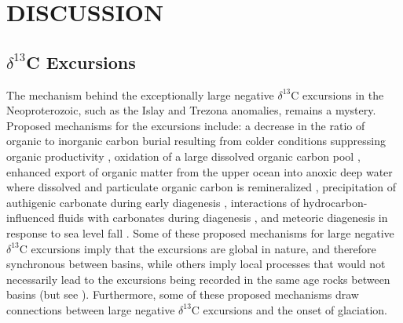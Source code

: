 \documentclass[11pt,letterpaper]{article}
\newcommand{\dC}{$\delta^{13}$C\xspace}
\begin{document}
\section*{DISCUSSION \label{sec:DISCUSSION}}

\subsection*{\dC Excursions \label{sec:dCExcursions}}

The mechanism behind the exceptionally large negative \dC excursions in the Neoproterozoic, such as the Islay and Trezona anomalies, remains a mystery. Proposed mechanisms for the excursions include: a decrease in the ratio of organic to inorganic carbon burial resulting from colder conditions suppressing organic productivity \citep{Kaufman1997a, Hoffman1998a}, oxidation of a large dissolved organic carbon pool \citep{Rothman2003a}, enhanced export of organic matter from the upper ocean into anoxic deep water where dissolved and particulate organic carbon is remineralized \citep{Tziperman2011a}, precipitation of authigenic carbonate during early diagenesis \citep{Schrag2013a}, interactions of hydrocarbon-influenced fluids with carbonates during diagenesis \citep{Derry2010a}, and meteoric diagenesis in response to sea level fall \citep{Swart2012a}. Some of these proposed mechanisms for large negative \dC excursions imply that the excursions are global in nature, and therefore synchronous between basins, while others imply local processes that would not necessarily lead to the excursions being recorded in the same age rocks between basins (but see \citealp{Swart2008a}). Furthermore, some of these proposed mechanisms draw connections between large negative \dC excursions and the onset of glaciation.
\end{document}
